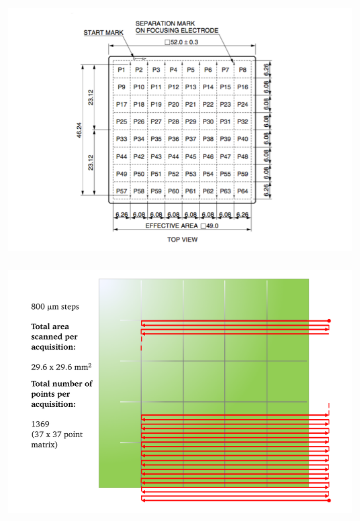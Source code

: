 \begin{figure}
\begin{subfigure}[t]{.5\textwidth}
\centering
\includegraphics[width=1\textwidth]{03_GraphicFiles/chapter3_CLaRySproto/Hodoscope/PM_specs_mod.pdf}
\caption{}
\label{chap3::fig::hodoPMscheme}
\end{subfigure}
\begin{subfigure}[t]{.5\textwidth}
\centering
\includegraphics[width=1\textwidth]{03_GraphicFiles/chapter3_CLaRySproto/Hodoscope/scan_logic.pdf}
\caption{}
\label{chap3::fig::hodoPMscanScheme}
\end{subfigure}
\caption{}
\label{chap3::fig::hodoScanDetails}
\end{figure}


